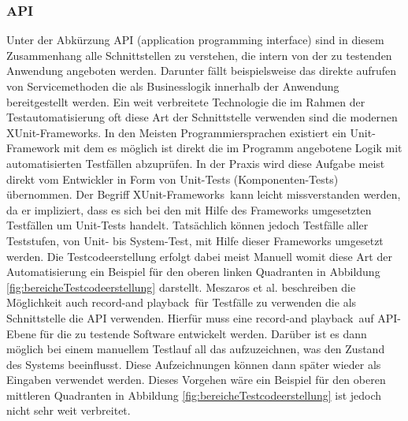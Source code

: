 \subsubsection{API}
\label{subsubsec:API}

Unter der Abkürzung API (application programming interface) sind in diesem Zusammenhang alle Schnittstellen zu verstehen, die intern von der zu testenden Anwendung angeboten werden. Darunter fällt beispielsweise das direkte aufrufen von Servicemethoden die als Businesslogik innerhalb der Anwendung bereitgestellt werden.
Ein weit verbreitete Technologie die im Rahmen der Testautomatisierung oft diese Art der Schnittstelle verwenden sind die modernen \grq XUnit-Frameworks\grq. In den Meisten Programmiersprachen existiert ein Unit-Framework mit dem es möglich ist direkt die im Programm angebotene Logik mit automatisierten Testfällen abzuprüfen. In der Praxis wird diese Aufgabe meist direkt vom Entwickler in Form von Unit-Tests (Komponenten-Tests) übernommen. Der Begriff \grq XUnit-Frameworks\grq\ kann leicht missverstanden werden, da er impliziert, dass es sich bei den mit Hilfe des Frameworks umgesetzten Testfällen um Unit-Tests handelt. Tatsächlich können jedoch Testfälle aller Teststufen, von Unit- bis System-Test, mit Hilfe dieser Frameworks umgesetzt werden.
Die Testcodeerstellung erfolgt dabei meist Manuell womit diese Art der Automatisierung ein Beispiel für den oberen linken Quadranten in Abbildung \ref{fig:bereicheTestcodeerstellung} darstellt.
Meszaros et al. \cite{meszaros_agile_2003} beschreiben die Möglichkeit auch \grq record-and playback\grq\ für Testfälle zu verwenden die als Schnittstelle die API verwenden.
Hierfür muss eine \grq record-and playback\grq\ auf API-Ebene für die zu testende Software entwickelt werden. Darüber ist es dann möglich bei einem manuellem Testlauf all das aufzuzeichnen, was den Zustand des Systems beeinflusst. Diese Aufzeichnungen können dann später wieder als Eingaben verwendet werden. Dieses Vorgehen wäre ein Beispiel für den oberen mittleren Quadranten in Abbildung \ref{fig:bereicheTestcodeerstellung} ist jedoch nicht sehr weit verbreitet.

